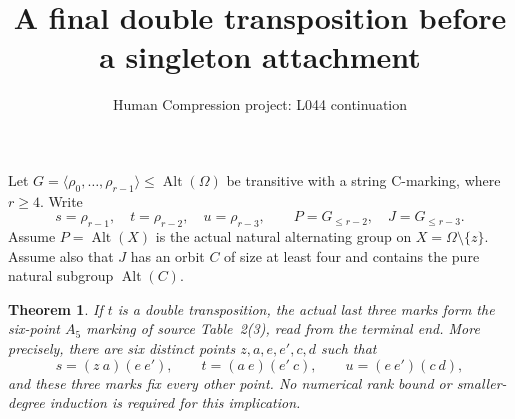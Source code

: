 \documentclass[11pt,a4paper]{article}
\title{A final double transposition before a singleton attachment}
\author{Human Compression project: L044 continuation}
\date{}
\newtheorem{theorem}{Theorem}
\newcommand{\gen}[1]{\langle#1\rangle}
\newcommand{\Alt}{\operatorname{Alt}}
\begin{document}
\maketitle
Let $G=\gen{\rho_0,\ldots,\rho_{r-1}}\le\Alt(\Omega)$
be transitive with a string C-marking, where $r\ge4$.
Write
\[
 s=\rho_{r-1},\quad t=\rho_{r-2},\quad u=\rho_{r-3},
 \qquad P=G_{\le r-2},\quad J=G_{\le r-3}.
\]
Assume $P=\Alt(X)$ is the actual natural alternating group
on $X=\Omega\setminus\{z\}$. Assume also that $J$ has an
orbit $C$ of size at least four and contains the pure
natural subgroup $\Alt(C)$.

\begin{theorem}
If $t$ is a double transposition, the actual last three
marks form the six-point $A_5$ marking of source Table~2(3),
read from the terminal end. More precisely, there are six
distinct points $z,a,e,e',c,d$ such that
\[
 s=(z\ a)(e\ e'),\qquad
 t=(a\ e)(e'\ c),\qquad
 u=(e\ e')(c\ d),                                  \tag{1}
\]
and these three marks fix every other point.
No numerical rank bound or smaller-degree induction is
required for this implication.
\end{theorem}
\end{document}
